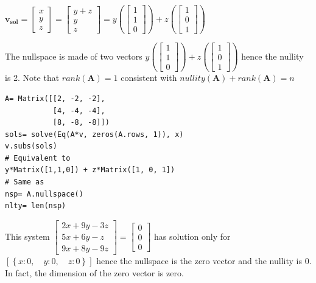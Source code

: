 $
\mathbf{v_{sol}} = \left[\begin{matrix}x\\y\\z\end{matrix}\right] =
\left[\begin{matrix}y + z\\y\\z\end{matrix}\right] =
y(\left[\begin{matrix}1\\1\\0\end{matrix}\right]) + z(\left[\begin{matrix}1\\0\\1\end{matrix}\right])
$

The nullspace is made of two vectors $y(\left[\begin{matrix}1\\1\\0\end{matrix}\right]) + z(\left[\begin{matrix}1\\0\\1\end{matrix}\right])$
hence the nullity is 2. Note that $rank(\mathbf{A}) = 1$ consistent with $nullity(\mathbf{A}) + rank(\mathbf{A}) = n$

\begin{verbatim}
A= Matrix([[2, -2, -2],
           [4, -4, -4],
           [8, -8, -8]])
sols= solve(Eq(A*v, zeros(A.rows, 1)), x)
v.subs(sols)
# Equivalent to
y*Matrix([1,1,0]) + z*Matrix([1, 0, 1])
# Same as
nsp= A.nullspace()
nlty= len(nsp)
\end{verbatim}

This system
$\left[\begin{matrix}2 x + 9 y - 3 z\\5 x + 6 y - z\\9 x + 8 y - 9 z\end{matrix}\right] =
\left[\begin{matrix}0\\0\\0\end{matrix}\right]$
has solution only for $\left [ \left \{ x : 0, \quad y : 0, \quad z : 0\right \}\right ]$
hence the nullspace is the zero vector and the nullity is 0. In fact, the
dimension of the zero vector is zero.

